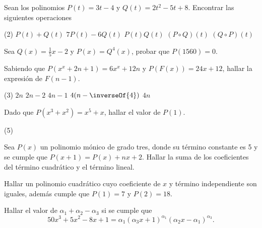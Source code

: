 \begin{multicols}{2}
    \begin{exercise}
        Sean los polinomios $P(t) = 3t - 4$ y $Q(t) = 2t^2 - 5t + 8$.
        Encontrar las siguientes operaciones
        \begin{tasks}(2)
            \task $P(t) + Q(t)$
            \task $7P(t) - 6Q(t)$
            \task $P(t)Q(t)$
            \task $(P \circ Q)(t)$
            \task $(Q \circ P)(t)$
        \end{tasks}
    \end{exercise}

    \begin{exercise}
        Sea $Q(x) = \frac{1}{5} x - 2$ y $P(x) = Q^4(x)$, probar que $P(1560) = 0$.
    \end{exercise}

    \begin{exercise}
        Sabiendo que $P(x^x + 2n + 1) = 6x^x + 12n$ y $P\left(F(x)\right) = 24x + 12$, hallar la expresión de $F(n - 1)$.
        \begin{tasks}[label=\Alph*)](3)
        \task $2n$
        \task $2n - 2$
        \task $4n - 1$
        \task $4(n - \inverseOf{4})$
        \task $4n$
        \end{tasks}
    \end{exercise}

    \begin{exercise}
        Dado que $P(x^3 + x^2) = x^5 + x$, hallar el valor de $P(1)$.
        \begin{tasks}[label=\Alph*)](5)
        \end{tasks}
    \end{exercise}

    \begin{problem}
        Sea $P(x)$ un polinomio mónico de grado tres, donde su término constante es 5 y se cumple que $P(x + 1) = P(x) + nx + 2$.
        Hallar la suma de los coeficientes del término cuadrático y el término lineal.
    \end{problem}

    \begin{problem}
        Hallar un polinomio cuadrático cuyo coeficiente de $x$ y término independiente son iguales, además cumple que $P(1) = 7$ y $P(2) = 18$.
    \end{problem}

    \begin{problem}
        Hallar el valor de $\alpha_1 + \alpha_2 - \alpha_3$ si se cumple que
        \[
            50x^3 + 5x^2 - 8x + 1 = \alpha_1 (\alpha_3 x + 1)^{\alpha_1} (\alpha_2 x - \alpha_1)^{\alpha_3}.
        \]
    \end{problem}


\end{multicols}
